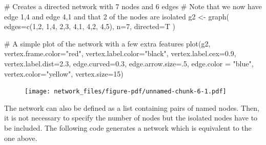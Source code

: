 \documentclass[
  letterpaper,
  DIV=11,
  numbers=noendperiod]{scrreprt}
\newenvironment{Shaded}{\begin{snugshade}}{\end{snugshade}}
\newcommand{\AttributeTok}[1]{\textcolor[rgb]{0.40,0.45,0.13}{#1}}
\newcommand{\CommentTok}[1]{\textcolor[rgb]{0.37,0.37,0.37}{#1}}
\newcommand{\DecValTok}[1]{\textcolor[rgb]{0.68,0.00,0.00}{#1}}
\newcommand{\FloatTok}[1]{\textcolor[rgb]{0.68,0.00,0.00}{#1}}
\newcommand{\FunctionTok}[1]{\textcolor[rgb]{0.28,0.35,0.67}{#1}}
\newcommand{\NormalTok}[1]{\textcolor[rgb]{0.00,0.23,0.31}{#1}}
\newcommand{\OtherTok}[1]{\textcolor[rgb]{0.00,0.23,0.31}{#1}}
\newcommand{\StringTok}[1]{\textcolor[rgb]{0.13,0.47,0.30}{#1}}
\begin{document}
\begin{Shaded}
\begin{Highlighting}[]
\CommentTok{\# Creates a directed network with 7 nodes and 6 edges }
\CommentTok{\# Note that we now have edge 1,4 and edge 4,1 and that 2 of the nodes are isolated}
\NormalTok{g2 }\OtherTok{\textless{}{-}} \FunctionTok{graph}\NormalTok{( }\AttributeTok{edges=}\FunctionTok{c}\NormalTok{(}\DecValTok{1}\NormalTok{,}\DecValTok{2}\NormalTok{, }\DecValTok{1}\NormalTok{,}\DecValTok{4}\NormalTok{, }\DecValTok{2}\NormalTok{,}\DecValTok{3}\NormalTok{, }\DecValTok{4}\NormalTok{,}\DecValTok{1}\NormalTok{, }\DecValTok{4}\NormalTok{,}\DecValTok{2}\NormalTok{, }\DecValTok{4}\NormalTok{,}\DecValTok{5}\NormalTok{), }\AttributeTok{n=}\DecValTok{7}\NormalTok{, }\AttributeTok{directed=}\NormalTok{T ) }

\CommentTok{\# A simple plot of the network with a few extra features}
\FunctionTok{plot}\NormalTok{(g2, }\AttributeTok{vertex.frame.color=}\StringTok{"red"}\NormalTok{,  }\AttributeTok{vertex.label.color=}\StringTok{"black"}\NormalTok{,}
\AttributeTok{vertex.label.cex=}\FloatTok{0.9}\NormalTok{, }\AttributeTok{vertex.label.dist=}\FloatTok{2.3}\NormalTok{, }\AttributeTok{edge.curved=}\FloatTok{0.3}\NormalTok{, }\AttributeTok{edge.arrow.size=}\NormalTok{.}\DecValTok{5}\NormalTok{, }\AttributeTok{edge.color =} \StringTok{"blue"}\NormalTok{, }\AttributeTok{vertex.color=}\StringTok{"yellow"}\NormalTok{, }\AttributeTok{vertex.size=}\DecValTok{15}\NormalTok{) }
\end{Highlighting}
\end{Shaded}

\begin{figure}[H]

{\centering \texttt{[image: network\_files/figure-pdf/unnamed-chunk-6-1.pdf]}

}

\end{figure}

The network can also be defined as a list containing pairs of named
nodes. Then, it is not necessary to specify the number of nodes but the
isolated nodes have to be included. The following code generates a
network which is equivalent to the one above.
\end{document}

